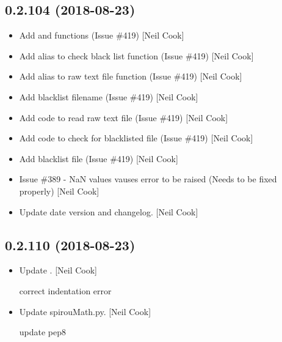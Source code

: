 \documentclass[a4paper,10pt,english]{report}
\begin{document}
\subsection{0.2.104 (2018-08-23)}
\label{\detokenize{misc/changelog:id354}}\begin{itemize}
\item {} 
Add  and  functions (Issue \#419) {[}Neil
Cook{]}

\item {} 
Add alias to check black list function (Issue \#419) {[}Neil Cook{]}

\item {} 
Add alias to raw text file function (Issue \#419) {[}Neil Cook{]}

\item {} 
Add blacklist filename (Issue \#419) {[}Neil Cook{]}

\item {} 
Add code to read raw text file (Issue \#419) {[}Neil Cook{]}

\item {} 
Add code to check for blacklisted file (Issue \#419) {[}Neil Cook{]}

\item {} 
Add blacklist file (Issue \#419) {[}Neil Cook{]}

\item {} 
Issue \#389 - NaN values vauses error to be raised (Needs to be fixed
properly) {[}Neil Cook{]}

\item {} 
Update date version and changelog. {[}Neil Cook{]}

\end{itemize}


\subsection{0.2.110 (2018-08-23)}
\label{\detokenize{misc/changelog:id355}}\begin{itemize}
\item {} 
Update . {[}Neil Cook{]}

correct indentation error

\item {} 
Update spirouMath.py. {[}Neil Cook{]}

update pep8

\end{itemize}
\end{document}
